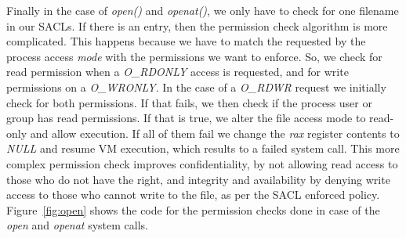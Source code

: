 \par Finally in the case of \textit{open()} and \textit{openat()}, we only have to check for one filename in our \ac{SACL}s. If there is an entry, then the permission check algorithm is more complicated. This happens because we have to match the requested by the process access \textit{mode} with the permissions we want to enforce. So, we check for read permission when a \textit{O\_RDONLY} access is requested, and for write permissions on a \textit{O\_WRONLY}. In the case of a \textit{O\_RDWR} request we initially check for both permissions. If that fails, we then check if the process user or group has read permissions. If that is true, we alter the file access mode to read-only and allow execution. If all of them fail we change the \textit{rax} register contents to \textit{NULL} and resume \ac{VM} execution, which results to a failed system call. This more complex permission check improves confidentiality, by not allowing read access to those who do not have the right, and integrity and availability by denying write access to those who cannot write to the file, as per the \ac{SACL} enforced policy. Figure~\ref{fig:open} shows the code for the permission checks done in case of the \textit{open} and \textit{openat} system calls.




